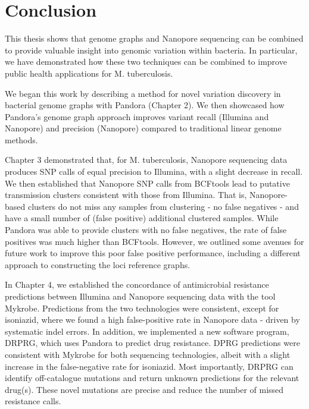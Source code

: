 \chapter*{Conclusion}
 
\label{chap:conclusion}

This thesis shows that genome graphs and Nanopore sequencing can be combined to provide valuable insight into genomic variation within bacteria. In particular, we have demonstrated how these two techniques can be combined to improve public health applications for M. tuberculosis.

We began this work by describing a method for novel variation discovery in bacterial genome graphs with Pandora (Chapter 2). We then showcased how Pandora's genome graph approach improves variant recall (Illumina and Nanopore) and precision (Nanopore) compared to traditional linear genome methods.

Chapter 3 demonstrated that, for M. tuberculosis, Nanopore sequencing data produces SNP calls of equal precision to Illumina, with a slight decrease in recall. We then established that Nanopore SNP calls from BCFtools lead to putative transmission clusters consistent with those from Illumina. That is, Nanopore-based clusters do not miss any samples from clustering - no false negatives - and have a small number of (false positive) additional clustered samples. While Pandora was able to provide clusters with no false negatives, the rate of false positives was much higher than BCFtools. However, we outlined some avenues for future work to improve this poor false positive performance, including a different approach to constructing the loci reference graphs. 

In Chapter 4, we established the concordance of antimicrobial resistance predictions between Illumina and Nanopore sequencing data with the tool Mykrobe. Predictions from the two technologies were consistent, except for isoniazid, where we found a high false-positive rate in Nanopore data - driven by systematic indel errors. In addition, we implemented a new software program, DRPRG, which uses Pandora to predict drug resistance. DPRG predictions were consistent with Mykrobe for both sequencing technologies, albeit with a slight increase in the false-negative rate for isoniazid. Most importantly, DRPRG can identify off-catalogue mutations and return unknown predictions for the relevant drug(s). These novel mutations are precise and reduce the number of missed resistance calls.

